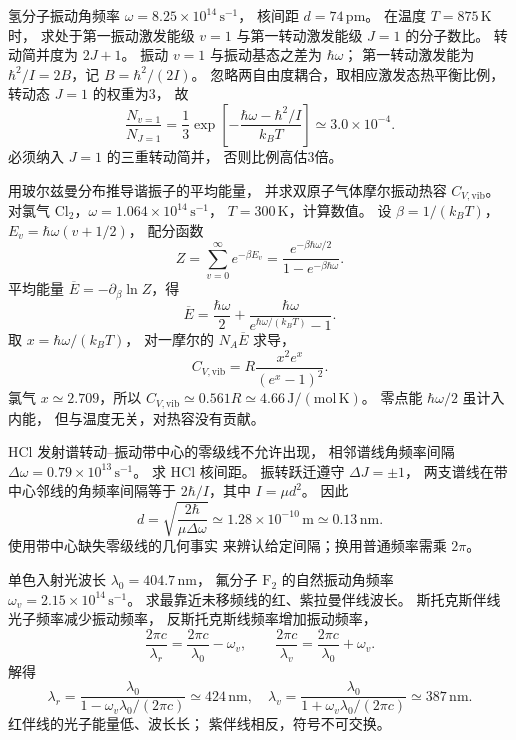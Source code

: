 氢分子振动角频率
$\omega=8.25\times10^{14}\,\mathrm{s^{-1}}$，
核间距 $d=74\,\mathrm{pm}$。
在温度 $T=875\,\mathrm K$ 时，
求处于第一振动激发能级 $v=1$
与第一转动激发能级 $J=1$ 的分子数比。
转动简并度为 $2J+1$。
\exsolution
振动 $v=1$ 与振动基态之差为
$\hbar\omega$；
第一转动激发能为
$\hbar^2/I=2B$，记 $B=\hbar^2/(2I)$。
忽略两自由度耦合，取相应激发态热平衡比例，
转动态 $J=1$ 的权重为3，
故
\[
 \boxed{\frac{N_{v=1}}{N_{J=1}}
 =\frac13\exp\!\left[
 -\frac{\hbar\omega-\hbar^2/I}{k_BT}\right]
 \simeq3.0\times10^{-4}}.
\]
\excheck 必须纳入 $J=1$ 的三重转动简并，
否则比例高估3倍。

用玻尔兹曼分布推导谐振子的平均能量，
并求双原子气体摩尔振动热容 $C_{V,\mathrm{vib}}$。
对氯气 $\mathrm{Cl_2}$，$\omega=1.064\times10^{14}\,\mathrm{s^{-1}}$，
$T=300\,\mathrm K$，计算数值。
\exsolution
设 $\beta=1/(k_BT)$，
$E_v=\hbar\omega(v+1/2)$，
配分函数
\[
 Z=\sum_{v=0}^\infty e^{-\beta E_v}
 =\frac{e^{-\beta\hbar\omega/2}}{1-e^{-\beta\hbar\omega}}.
\]
平均能量
$\overline E=-\partial_\beta\ln Z$，得
\[
 \boxed{\overline E=
 \frac{\hbar\omega}{2}
 +\frac{\hbar\omega}{e^{\hbar\omega/(k_BT)}-1}}.
\]
取 $x=\hbar\omega/(k_BT)$，
对一摩尔的 $N_A\overline E$ 求导，
\[
 \boxed{C_{V,\mathrm{vib}}=
 R\frac{x^2e^x}{(e^x-1)^2}}.
\]
氯气 $x\simeq2.709$，所以
$\boxed{C_{V,\mathrm{vib}}\simeq0.561R
 \simeq4.66\,\mathrm{J/(mol\,K)}}$。
\excheck 零点能 $\hbar\omega/2$ 虽计入内能，
但与温度无关，对热容没有贡献。

HCl 发射谱转动--振动带中心的零级线不允许出现，
相邻谱线角频率间隔
$\Delta\omega=0.79\times10^{13}\,\mathrm{s^{-1}}$。
求 HCl 核间距。
\exsolution
振转跃迁遵守 $\Delta J=\pm1$，
两支谱线在带中心邻线的角频率间隔等于
$2\hbar/I$，其中 $I=\mu d^2$。
因此
\[
 \boxed{d=\sqrt{\frac{2\hbar}{\mu\Delta\omega}}
 \simeq1.28\times10^{-10}\,\mathrm m
 \simeq0.13\,\mathrm{nm}}.
\]
\excheck 使用带中心缺失零级线的几何事实
来辨认给定间隔；换用普通频率需乘 $2\pi$。

单色入射光波长 $\lambda_0=404.7\,\mathrm{nm}$，
氟分子 $\mathrm{F_2}$ 的自然振动角频率
$\omega_v=2.15\times10^{14}\,\mathrm{s^{-1}}$。
求最靠近未移频线的红、紫拉曼伴线波长。
\exsolution
斯托克斯伴线光子频率减少振动频率，
反斯托克斯线频率增加振动频率，
\[
 \frac{2\pi c}{\lambda_r}=
 \frac{2\pi c}{\lambda_0}-\omega_v,\qquad
 \frac{2\pi c}{\lambda_v}=
 \frac{2\pi c}{\lambda_0}+\omega_v.
\]
解得
\[
 \boxed{\lambda_r=
 \frac{\lambda_0}{1-\omega_v\lambda_0/(2\pi c)}
 \simeq424\,\mathrm{nm}},\quad
 \boxed{\lambda_v=
 \frac{\lambda_0}{1+\omega_v\lambda_0/(2\pi c)}
 \simeq387\,\mathrm{nm}}.
\]
\excheck 红伴线的光子能量低、波长长；
紫伴线相反，符号不可交换。

